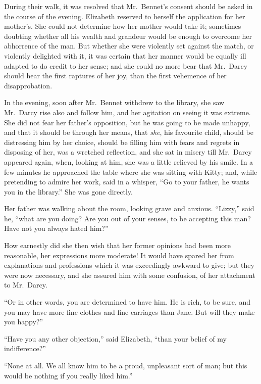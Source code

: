 During their walk, it was resolved that Mr.\ Bennet’s
consent should be asked in the course of the evening.
Elizabeth reserved to herself the application for her
mother’s. She could not determine how her mother
would take it; sometimes doubting whether all his wealth
and grandeur would be enough to overcome her abhorrence
of the man. But whether she were violently set
against the match, or violently delighted with it, it was
certain that her manner would be equally ill adapted to
do credit to her sense; and she could no more bear that
Mr.\ Darcy should hear the first raptures of her joy, than
the first vehemence of her disapprobation.

\strut

In the evening, soon after Mr.\ Bennet withdrew to the
library, she saw Mr.\ Darcy rise also and follow him, and
her agitation on seeing it was extreme. She did not fear
her father’s opposition, but he was going to be made
unhappy, and that it should be through her means, that
\textit{she}, his favourite child, should be distressing him by her
choice, should be filling him with fears and regrets in
disposing of her, was a wretched reflection, and she sat
in misery till Mr.\ Darcy appeared again, when, looking
at him, she was a little relieved by his smile. In a few
minutes he approached the table where she was sitting
with Kitty; and, while pretending to admire her work,
said in a whisper, “Go to your father, he wants you in
the library.” She was gone directly.

Her father was walking about the room, looking grave
and anxious. “Lizzy,” said he, “what are you doing?
Are you out of your senses, to be accepting this man?
Have not you always hated him?”

How earnestly did she then wish that her former
opinions had been more reasonable, her expressions more
moderate! It would have spared her from explanations
and professions which it was exceedingly awkward to
give; but they were now necessary, and she assured him
with some confusion, of her attachment to Mr.\ Darcy.

“Or in other words, you are determined to have him.
He is rich, to be sure, and you may have more fine clothes
and fine carriages than Jane. But will they make you
happy?”

“Have you any other objection,” said Elizabeth, “than
your belief of my indifference?”

“None at all. We all know him to be a proud, unpleasant
sort of man; but this would be nothing if you
really liked him.”

